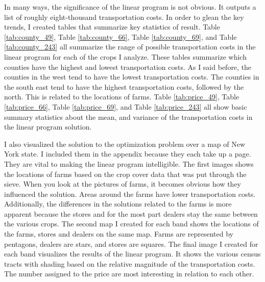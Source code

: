 \documentclass{report}
\begin{document}
In many ways, the significance of the linear program is not obvious. It outputs a list of roughly eight-thousand transportation costs. In order to glean the key trends, I created tables that summarize key statistics of result. Table \ref{tab:county_49}, Table \ref{tab:county_66}, Table \ref{tab:county_69}, and Table \ref{tab:county_243} all summarize the range of possible transportation costs in the linear program for each of the crops I analyze. These tables summarize which counties have the highest and lowest transportation costs. As I said before, the counties in the west tend to have the lowest transportation costs. The counties in the south east tend to have the highest transportation costs, followed by the north. This is related to the locations of farms. Table  \ref{tab:price_49}, Table  \ref{tab:price_66}, Table  \ref{tab:price_69}, and Table  \ref{tab:price_243} all show basic summary statistics about the mean, and variance of the transportation costs in the linear program solution.

I also visualized the solution to the optimization problem over a map of New York state. I included them in the appendix because they each take up a page. They are vital to making the linear program intelligible. The first images shows the locations of farms based on the crop cover data that was put through the sieve. When you look at the pictures of farms, it becomes obvious how they influenced the solution. Areas around the farms have lower transportation costs. Additionally, the differences in the solutions related to the farms is more apparent because the stores and for the most part dealers stay the same between the various crops. The second map I created for each band shows the locations of the farms, stores and dealers on the same map. Farms are represented by pentagons, dealers are stars, and stores are squares. The final image I created for each band visualizes the results of the linear program. It shows the various census tracts with shading based on the relative magnitude of the transportation costs. The number assigned to the price are most interesting in relation to each other.

\end{document}
